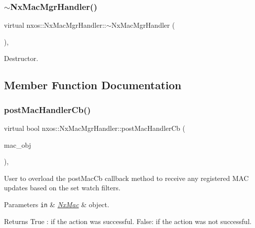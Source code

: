 \subsubsection{\texorpdfstring{$\sim$\+Nx\+Mac\+Mgr\+Handler()}{~NxMacMgrHandler()}}
{\footnotesize\ttfamily virtual nxos\+::\+Nx\+Mac\+Mgr\+Handler\+::$\sim$\+Nx\+Mac\+Mgr\+Handler (\begin{DoxyParamCaption}{ }\end{DoxyParamCaption})\hspace{0.3cm}{\ttfamily [inline]}, {\ttfamily [virtual]}}

Destructor. 

\subsection{Member Function Documentation}
\mbox{\label{classnxos_1_1_nx_mac_mgr_handler_a3a15935d8cd001a554d32a5d7ab216b5}} 
\subsubsection{\texorpdfstring{post\+Mac\+Handler\+Cb()}{postMacHandlerCb()}}
{\footnotesize\ttfamily virtual bool nxos\+::\+Nx\+Mac\+Mgr\+Handler\+::post\+Mac\+Handler\+Cb (\begin{DoxyParamCaption}\item[{\mbox{\hyperlink{classnxos_1_1_nx_mac}{Nx\+Mac}} $\ast$}]{mac\+\_\+obj }\end{DoxyParamCaption})\hspace{0.3cm}{\ttfamily [inline]}, {\ttfamily [virtual]}}

User to overload the post\+Mac\+Cb callback method to receive any registered M\+AC updates based on the set watch filters. 
\begin{DoxyParams}[1]{Parameters}
\mbox{\tt in}  & {\em \mbox{\hyperlink{classnxos_1_1_nx_mac}{Nx\+Mac}}} & object.\\
\hline
\end{DoxyParams}
\begin{DoxyReturn}{Returns}
True \+: if the action was successful. False\+: if the action was not successful.
\end{DoxyReturn}

